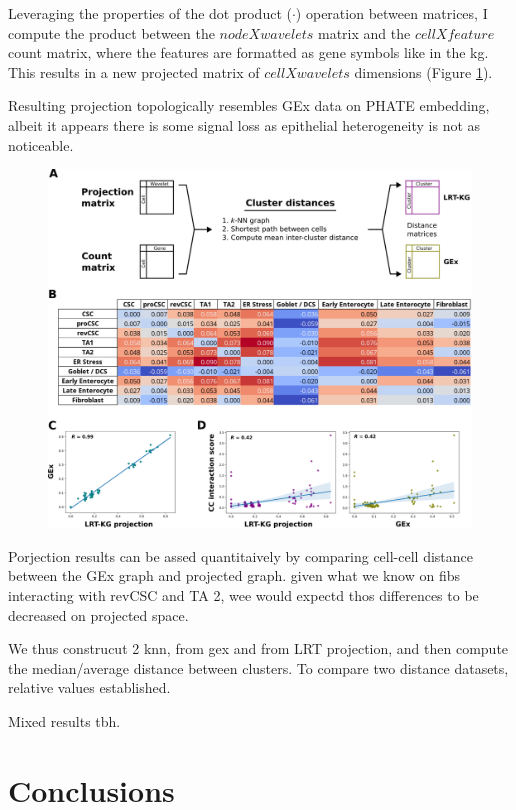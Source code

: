 Leveraging the properties of the dot product (\(\cdot\)) operation between matrices, I compute the product between the \(node X wavelets\) matrix and the \(cell X feature\) count matrix, where the features are formatted as gene symbols like in the \acrshort{kg}. This results in a new projected matrix of \(cell X wavelets\) dimensions (Figure \ref{}).

Resulting projection topologically resembles GEx data on PHATE embedding, albeit it appears there is some signal loss as epithelial heterogeneity is not as noticeable.

\begin{figure}
    \centering
    \includegraphics{06kg/figs/6KG_bench.png}
    \caption{}
    \label{fig:6bench}
\end{figure}

Porjection results can be assed quantitaively by comparing cell-cell distance between the GEx graph and projected graph. given what we know on fibs interacting with revCSC and TA 2, wee would expectd thos differences to be decreased on projected space.

We thus construcut 2 knn, from gex and from LRT projection, and then compute the median/average distance between clusters. To compare two distance datasets, relative values established.

Mixed results tbh.

\newpage
\section{Conclusions}

